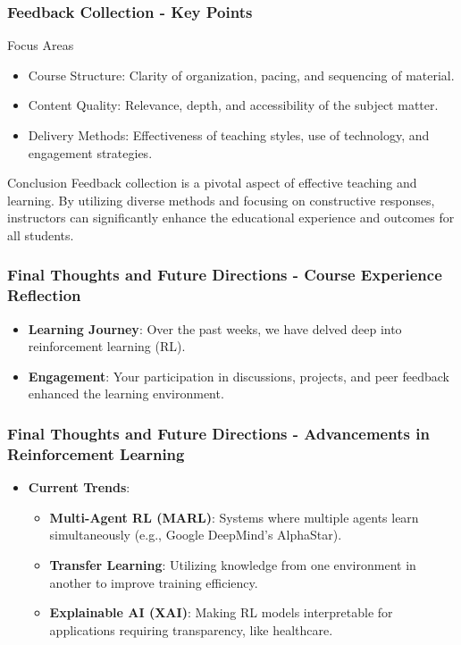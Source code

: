\documentclass[aspectratio=169]{beamer}
\begin{document}
\begin{frame}[fragile]
    \frametitle{Feedback Collection - Key Points}
    \begin{block}{Focus Areas}
        \begin{itemize}
            \item Course Structure: Clarity of organization, pacing, and sequencing of material.
            \item Content Quality: Relevance, depth, and accessibility of the subject matter.
            \item Delivery Methods: Effectiveness of teaching styles, use of technology, and engagement strategies.
        \end{itemize}
    \end{block}

    \begin{block}{Conclusion}
        Feedback collection is a pivotal aspect of effective teaching and learning. By utilizing diverse methods and focusing on constructive responses, instructors can significantly enhance the educational experience and outcomes for all students.
    \end{block}
\end{frame}

\begin{frame}[fragile]
    \frametitle{Final Thoughts and Future Directions - Course Experience Reflection}
    \begin{itemize}
        \item \textbf{Learning Journey}: 
        Over the past weeks, we have delved deep into reinforcement learning (RL).
        \item \textbf{Engagement}: 
        Your participation in discussions, projects, and peer feedback enhanced the learning environment. 
    \end{itemize}
\end{frame}

\begin{frame}[fragile]
    \frametitle{Final Thoughts and Future Directions - Advancements in Reinforcement Learning}
    \begin{itemize}
        \item \textbf{Current Trends}:
        \begin{itemize}
            \item \textbf{Multi-Agent RL (MARL)}: 
            Systems where multiple agents learn simultaneously (e.g., Google DeepMind’s AlphaStar).
            \item \textbf{Transfer Learning}: 
            Utilizing knowledge from one environment in another to improve training efficiency.
            \item \textbf{Explainable AI (XAI)}: 
            Making RL models interpretable for applications requiring transparency, like healthcare.
        \end{itemize}
    \end{itemize}
\end{frame}
\end{document}
